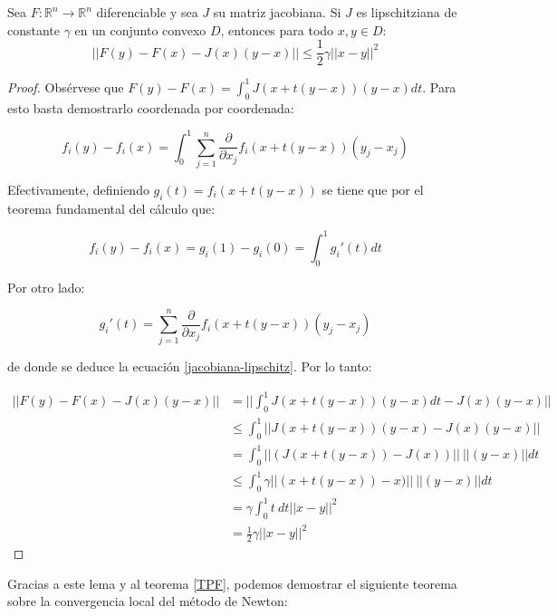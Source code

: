 \begin{lemma}
Sea $F : \mathbb{R}^n \to \mathbb{R}^n$ diferenciable y sea $J$ su matriz jacobiana. Si $J$ es lipschitziana de constante $\gamma$  en un conjunto convexo $D$, entonces para todo $x,y \in D$:
\[ || F(y)-F(x)-J(x)(y-x) || \leq \frac{1}{2} \gamma ||x-y||^2 \]
\end{lemma}
\begin{proof}
Obsérvese que $F(y)-F(x) = \int_0^1 J(x + t(y-x))(y-x) dt$. Para esto basta demostrarlo coordenada por coordenada:

\begin{equation}\label{jacobiana-lipschitz} f_i(y)-f_i(x) = \int_0^1 \sum_{j=1}^n \frac{\partial}{\partial x_j} f_i(x + t(y-x))(y_j-x_j)\end{equation}

Efectivamente, definiendo $g_i(t) = f_i(x+t(y-x))$ se tiene que por el teorema fundamental del cálculo que:

\[ f_i(y)-f_i(x) = g_i(1) - g_i(0) = \int_0^1 g_i'(t) dt \]

Por otro lado:

\[ g_i'(t) = \sum_{j=1}^n \frac{\partial}{\partial x_j} f_i(x + t(y-x))(y_j-x_j) \]

de donde se deduce la ecuación \eqref{jacobiana-lipschitz}. Por lo tanto:

\begin{align*}||F(y)-F(x) - J(x)(y-x)|| & = ||\int_0^1 J(x + t(y-x))(y-x) dt- J(x)(y-x)||\\
& \leq \int_0^1 ||J(x + t(y-x))(y-x)- J(x)(y-x)||\\
& = \int_0^1 ||(J(x + t(y-x))- J(x))||\ ||(y-x)|| dt\\
& \leq \int_0^1 \gamma ||(x + t(y-x)) - x)||\ ||(y-x)|| dt\\
& = \gamma \int_0^1 t\ dt ||x-y||^2\\
& = \frac{1}{2} \gamma ||x-y||^2
\end{align*}
\end{proof}

Gracias a este lema y al teorema \ref{TPF}, podemos demostrar el siguiente teorema sobre la convergencia local del método de Newton:

